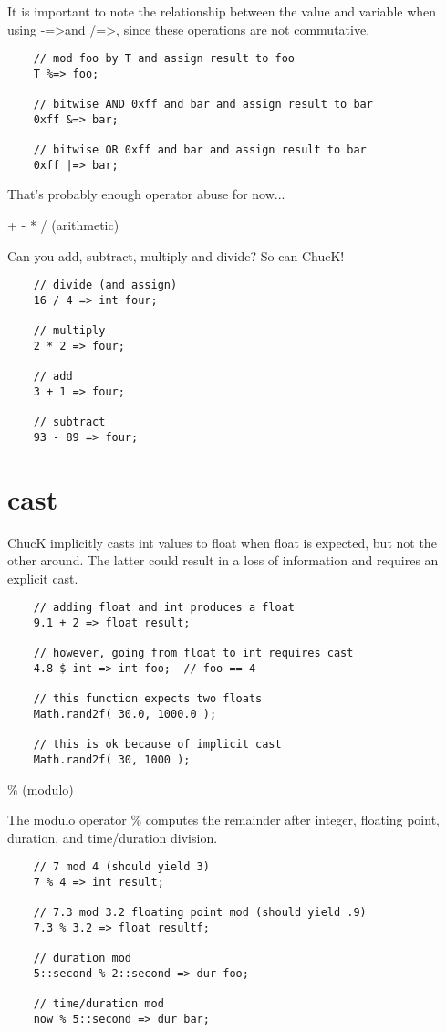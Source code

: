 It is important to note the relationship between the value and variable when using -=\textgreater and /=\textgreater, since these operations are not commutative.
\begin{verbatim}
    // mod foo by T and assign result to foo
    T %=> foo;

    // bitwise AND 0xff and bar and assign result to bar
    0xff &=> bar;

    // bitwise OR 0xff and bar and assign result to bar
    0xff |=> bar;
\end{verbatim}

That's probably enough operator abuse for now...
 
+ - * / (arithmetic)

Can you add, subtract, multiply and divide? So can ChucK!
\begin{verbatim}
    // divide (and assign)
    16 / 4 => int four;

    // multiply
    2 * 2 => four;

    // add
    3 + 1 => four;

    // subtract
    93 - 89 => four;
\end{verbatim}

\section{cast}

ChucK implicitly casts int values to float when float is expected, but not the other around. The latter could result in a loss of information and requires an explicit cast.
\begin{verbatim}
    // adding float and int produces a float
    9.1 + 2 => float result;

    // however, going from float to int requires cast
    4.8 $ int => int foo;  // foo == 4

    // this function expects two floats
    Math.rand2f( 30.0, 1000.0 );

    // this is ok because of implicit cast
    Math.rand2f( 30, 1000 );
\end{verbatim}
 

\% (modulo)

The modulo operator \% computes the remainder after integer, floating point, duration, and time/duration division.
\begin{verbatim}
    // 7 mod 4 (should yield 3)
    7 % 4 => int result;

    // 7.3 mod 3.2 floating point mod (should yield .9)
    7.3 % 3.2 => float resultf;

    // duration mod
    5::second % 2::second => dur foo;

    // time/duration mod
    now % 5::second => dur bar;
\end{verbatim}

